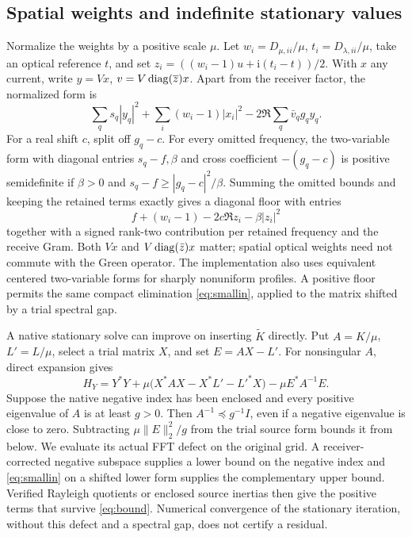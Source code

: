 \documentclass[anonymous,12pt]{iopjournal}
\theoremstyle{remark}\newtheorem{remark}[theorem]{Remark}
\numberwithin{equation}{section}
\begin{document}
\subsection{Spatial weights and indefinite stationary values}
Normalize the weights by a positive scale $\mu$. Let $w_i=D_{\mu,ii}/\mu$, $t_i=D_{\lambda,ii}/\mu$, take an optical reference $t$, and set $z_i=((w_i-1)u+\mathrm i(t_i-t))/2$. With $x$ any current, write $y=Vx$, $v=V\operatorname{diag}(\overline z)x$. Apart from the receiver factor, the normalized form is
\[
 \sum_q s_q |y_q|^2+\sum_i(w_i-1)|x_i|^2-
                 2\Re\sum_q\bar v_q g_q y_q .
\]
For a real shift $c$, split off $g_q-c$. For every omitted frequency, the two-variable form with diagonal entries $s_q-f,\beta$ and cross coefficient $-(g_q-c)$ is positive semidefinite if $\beta>0$ and $s_q-f\ge |g_q-c|^2/\beta$. Summing the omitted bounds and keeping the retained terms exactly gives a diagonal floor with entries
\[
 f+(w_i-1)-2c\Re z_i-\beta |z_i|^2
\]
together with a signed rank-two contribution per retained frequency and the receive Gram. Both $Vx$ and $V\operatorname{diag}(\bar z)x$ matter; spatial optical weights need not commute with the Green operator. The implementation also uses equivalent centered two-variable forms for sharply nonuniform profiles. A positive floor permits the same compact elimination \eqref{eq:smallin}, applied to the matrix shifted by a trial spectral gap.

A native stationary solve can improve on inserting $\widetilde K$ directly. Put $A=K/\mu$, $L'=L/\mu$, select a trial matrix $X$, and set $E=AX-L'$. For nonsingular $A$, direct expansion gives
\begin{equation}
 H_Y=Y^*Y+\mu\big(X^*AX-X^*L'-L'^*X\big)-\mu E^*A^{-1}E .\label{eq:defect}
\end{equation}
Suppose the native negative index has been enclosed and every positive eigenvalue of $A$ is at least $g>0$. Then $A^{-1}\preceq g^{-1}I$, even if a negative eigenvalue is close to zero. Subtracting $\mu\|E\|_2^2/g$ from the trial source form bounds it from below. We evaluate its actual FFT defect on the original grid. A receiver-corrected negative subspace supplies a lower bound on the negative index and \eqref{eq:smallin} on a shifted lower form supplies the complementary upper bound. Verified Rayleigh quotients or enclosed source inertias then give the positive terms that survive \eqref{eq:bound}. Numerical convergence of the stationary iteration, without this defect and a spectral gap, does not certify a residual.
\end{document}
